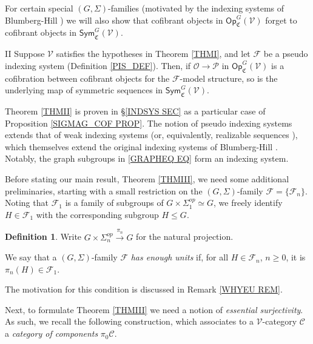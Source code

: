 \documentclass[a4paper,10pt
,draft
]{article}%
\numberwithin{equation}{section}
\numberwithin{figure}{section}
\theoremstyle{definition} %
\newtheorem{definition}[equation]{Definition}%
\newcommand{\Sym}{\ensuremath{\mathsf{Sym}}}%
\newcommand{\Op}{\mathsf{Op}}%
\newcommand{\F}{\ensuremath{\mathcal F}}
\newcommand{\V}{\ensuremath{\mathcal V}}
\renewcommand{\O}{\ensuremath{\mathcal O}}
\newcommand{\1}{\ensuremath{\mathbbm 1}}%
\begin{document}
For certain special $(G,\Sigma)$-families
(motivated by the indexing systems of Blumberg-Hill \cite{BH15})
we will also show that cofibrant objects in 
$\Op^G_{\mathfrak C}(\V)$
forget to cofibrant objects in 
$\mathsf{Sym}^G_{\mathfrak C}(\V)$.


\begin{customthm}{II}\label{THMII}
	Suppose $\V$ satisfies the hypotheses in Theorem \ref{THMI},
	and let $\F$ be a pseudo indexing system (Definition \ref{PIS_DEF}).
	Then, if $\O \to \mathcal{P}$ in $\Op^G_{\mathfrak{C}}(\V)$ is a cofibration between cofibrant objects for the $\F$-model structure,
	so is the underlying
	map of symmetric sequences in $\Sym^G_{\mathfrak{C}}(\V)$.
\end{customthm}


Theorem \ref{THMII} is proven in \S \ref{INDSYS SEC}
as a particular case of Proposition \ref{SIGMAG_COF PROP}.
The notion of pseudo indexing systems
extends that of weak indexing systems \cite[Defn. 4.49]{BP_geo}
(or, equivalently, realizable sequences \cite[Defn. 4.6]{GW18}),
which themselves extend the original 
indexing systems of Blumberg-Hill \cite{BH15}.
Notably, the graph subgroups in \eqref{GRAPHEQ EQ} form an indexing system.


\vskip 10pt


Before stating our main result, Theorem \ref{THMIII},
we need some additional preliminaries,
starting with a small restriction on the 
$(G,\Sigma)$-family $\mathcal{F} = \{\F_n\}$.
Noting that $\F_1$ is a family of subgroups of 
$G \times \Sigma_1^{op} \simeq G$,
we freely identify 
$H \in \F_1$ with the corresponding subgroup $H \leq G$.

\begin{definition}\label{FAMRESUNI DEF}
	Write $G \times \Sigma_n^{op} \xrightarrow{\pi_n} 
	G$
	for the natural projection.
	
	We say that a $(G,\Sigma)$-family $\F$ 
	\emph{has enough units}	if,
	for all $H \in \F_n$, $n\geq 0$,
	it is $\pi_n(H) \in \F_1$.
\end{definition}

The motivation for this condition is discussed in Remark \ref{WHYEU REM}.


Next, to formulate Theorem \ref{THMIII} we need a notion of 
\emph{essential surjectivity}.
As such, we recall the following construction, 
which associates to a $\V$-category $\mathcal{C}$
a \emph{category of components} $\pi_0 \mathcal{C}$.
\end{document}
